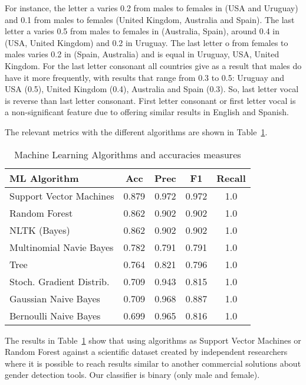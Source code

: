 \documentclass[a4paper]{article}
\begin{document}
For instance, the letter a varies 0.2 from males to females in (USA and Uruguay) and 0.1 from males to females (United Kingdom, Australia and Spain).
The last letter a varies 0.5 from males to females in (Australia, Spain), around 0.4 in (USA, United Kingdom) and 0.2 in
Uruguay.
The last letter o from females to males varies 0.2 in (Spain, Australia) and is equal in Uruguay, USA, United Kingdom.
For the last letter consonant all countries give as a result that males do have it more frequently, with results that range from 0.3 to 0.5: Uruguay and USA (0.5), United Kingdom (0.4), Australia and Spain (0.3). 
So, last letter vocal is reverse than last letter consonant. 
First letter consonant or first letter vocal is a non-significant feature due to offering similar results in English and Spanish.


The relevant metrics with the different algorithms are shown in Table~\ref{table:MLAccuracies}.

\begin{table}
\footnotesize
\center
\begin{tabular}[]{lcccc}
  \hline
  ML Algorithm & Acc & Prec & F1 & Recall \tabularnewline
  \hline
 Support Vector Machines             &    0.879 &     0.972 &   0.972 &    1.0  \tabularnewline
 Random Forest                       &    0.862 &     0.902 &   0.902 &    1.0  \tabularnewline
 NLTK (Bayes)                        &    0.862 &     0.902 &   0.902 &    1.0  \tabularnewline
 Multinomial Navie Bayes             &    0.782 &     0.791 &   0.791 &    1.0  \tabularnewline
 Tree                                &    0.764 &     0.821 &   0.796 &    1.0  \tabularnewline
 Stoch. Gradient Distrib.    &    0.709 &     0.943 &   0.815 &    1.0  \tabularnewline
 Gaussian Naive Bayes                &    0.709 &     0.968 &   0.887 &    1.0  \tabularnewline
 Bernoulli Naive Bayes               &    0.699 &     0.965 &   0.816 &    1.0  \tabularnewline
 
\hline
\end{tabular}
\caption{Machine Learning Algorithms and accuracies measures}
\label{table:MLAccuracies}
\end{table}

The results in Table~\ref{table:MLAccuracies} show that using algorithms as Support Vector Machines or Random Forest against a scientific dataset created by independent researchers where it is possible to reach results similar to another commercial solutions about gender detection tools.
Our classifier is binary (only male and female).
\end{document}
